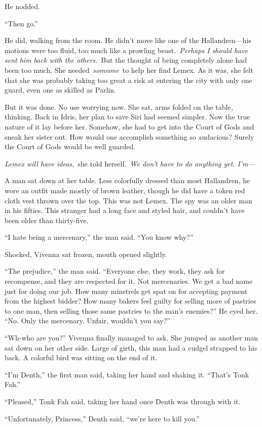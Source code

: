 He nodded.

“Then go.”

He did, walking from the room. He didn’t move like one of the Hallandren—his motions were too fluid, too much like a prowling beast.~\textit{Perhaps I should have sent him back with the others.}~But the thought of being completely alone had been too much. She needed~\textit{someone}~to help her find Lemex. As it was, she felt that she was probably taking too great a risk at entering the city with only one guard, even one as skilled as Parlin.

But it was done. No use worrying now. She sat, arms folded on the table, thinking. Back in Idris, her plan to save Siri had seemed simpler. Now the true nature of it lay before her. Somehow, she had to get into the Court of Gods and sneak her sister out. How would one accomplish something so audacious? Surely the Court of Gods would be well guarded.

\textit{Lemex will have ideas,}~she told herself.~\textit{We don’t have to do anything yet. I’m—}

A man sat down at her table. Less colorfully dressed than most Hallandren, he wore an outfit made mostly of brown leather, though he did have a token red cloth vest thrown over the top. This was not Lemex. The spy was an older man in his fifties. This stranger had a long face and styled hair, and couldn’t have been older than thirty-five.

“I hate being a mercenary,” the man said. “You know why?”

Shocked, Vivenna sat frozen, mouth opened slightly.

“The prejudice,” the man said. “Everyone else, they work, they ask for recompense, and they are respected for it. Not mercenaries. We get a bad name just for doing our job. How many minstrels get spat on for accepting payment from the highest bidder? How many bakers feel guilty for selling more of pastries to one man, then selling those same pastries to the man’s enemies?” He eyed her. “No. Only the mercenary. Unfair, wouldn’t you say?”

“Wh-who are you?” Vivenna finally managed to ask. She jumped as another man sat down on her other side. Large of girth, this man had a cudgel strapped to his back. A colorful bird was sitting on the end of it.

“I’m Denth,” the first man said, taking her hand and shaking it. “That’s Tonk Fah.”

“Pleased,” Tonk Fah said, taking her hand once Denth was through with it.

“Unfortunately, Princess,” Denth said, “we’re here to kill you.”

